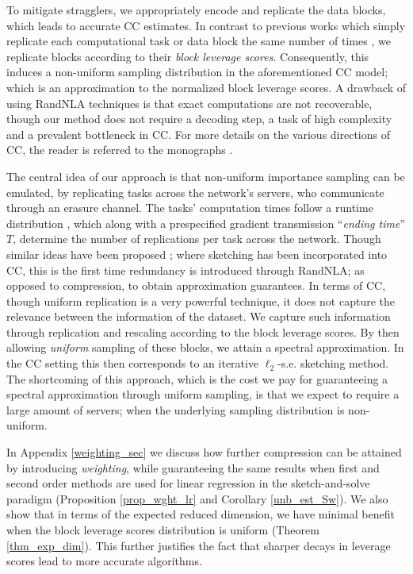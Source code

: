 \documentclass[journal,letterpaper,onecolumn,twoside,nofonttune]{IEEEtran}
\begin{document}
To mitigate stragglers, we appropriately encode and replicate the data blocks, which leads to accurate CC estimates. In contrast to previous works which simply replicate each computational task or data block the same number of times \cite{ZKJKS08,TLDK17,CMH20,CMH21}, we replicate blocks according to their \textit{block leverage scores}. Consequently, this induces a non-uniform sampling distribution in the aforementioned CC model; which is an approximation to the normalized block leverage scores. A drawback of using RandNLA techniques is that exact computations are not recoverable, though our method does not require a decoding step, a task of high complexity and a prevalent bottleneck in CC. For more details on the various directions of CC, the reader is referred to the monographs \cite{LA20,ng2021}.

The central idea of our approach is that non-uniform importance sampling can be emulated, by replicating tasks across the network's servers, who communicate through an erasure channel. The tasks' computation times follow a runtime distribution \cite{LLPPR17}, which along with a prespecified gradient transmission ``\textit{ending time}'' $T$, determine the number of replications per task across the network. Though similar ideas have been proposed \cite{GWCR18,GKCMR20,CPH20a,CPH20c}; where sketching has been incorporated into CC, this is the first time redundancy is introduced through RandNLA; as opposed to compression, to obtain approximation guarantees. In terms of CC, though uniform replication is a very powerful technique, it does not capture the relevance between the information of the dataset. We capture such information through replication and rescaling according to the block leverage scores. By then allowing \textit{uniform} sampling of these blocks, we attain a spectral approximation. In the CC setting this then corresponds to an iterative $\ell_2$-s.e. sketching method. The shortcoming of this approach, which is the cost we pay for guaranteeing a spectral approximation through uniform sampling, is that we expect to require a large amount of servers; when the underlying sampling distribution is non-uniform.

In Appendix \ref{weighting_sec} we discuss how further compression can be attained by introducing \textit{weighting}, while guaranteeing the same results when first and second order methods are used for linear regression in the sketch-and-solve paradigm (Proposition \ref{prop_wght_lr} and Corollary \ref{unb_est_Sw}). We also show that in terms of the expected reduced dimension, we have minimal benefit when the block leverage scores distribution is uniform (Theorem \ref{thm_exp_dim}). This further justifies the fact that sharper decays in leverage scores lead to more accurate algorithms\cite{PKB14}.%
\end{document}
